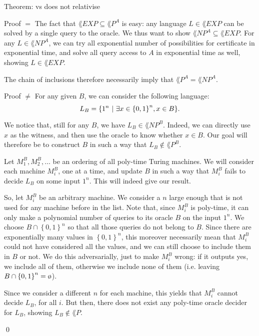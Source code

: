 \documentclass[a4paper]{article}
\begin{document}
\begin{parag}{Theorem:  vs  does not relativise}
\begin{subparag}{Proof $=$}
        The fact that $\lang{EXP} \subseteq \lang{P}^A$ is easy: any language $L \in \lang{EXP}$ can be solved by a single query to the oracle. We thus want to show $\lang{NP}^A \subseteq \lang{EXP}$. For any $L \in \lang{NP}^A$, we can try all exponential number of possibilities for certificate in exponential time, and solve all query access to $A$ in exponential time as well, showing $L \in \lang{EXP}$.

        The chain of inclusions therefore necessarily imply that $\lang{P}^A = \lang{NP}^A$.
    \end{subparag}

    \begin{subparag}{Proof $\neq$}
        For any given $B$, we can consider the following language: 
        \[L_B = \left\{1^n \suchthat \exists x \in \left\{0, 1\right\}^n, x \in B\right\}.\]

        We notice that, still for any $B$, we have $L_B \in \lang{NP}^B$. Indeed, we can directly use $x$ as the witness, and then use the oracle to know whether $x \in B$. Our goal will therefore be to construct $B$ in such a way that $L_B \not \in \lang{P}^B$.

        Let $M_1^B, M_2^B, \ldots$ be an ordering of all poly-time Turing machines. We will consider each machine $M_i^B$, one at a time, and update $B$ in such a way that $M_i^B$ fails to decide $L_B$ on some input $1^n$. This will indeed give our result. 

        So, let $M_i^B$ be an arbitrary machine. We consider a $n$ large enough that is not used for any machine before in the list. Note that, since $M_i^B$ is poly-time, it can only make a polynomial number of queries to its oracle $B$ on the input $1^n$. We choose $B \cap \left\{0, 1\right\}^n$ so that all those queries do not belong to $B$. Since there are exponentially many values in $\left\{0, 1\right\}^n$, this moreover necessarily mean that $M_i^B$ could not have considered all the values, and we can still choose to include them in $B$ or not. We do this adversarially, just to make $M_i^B$ wrong: if it outputs yes, we include all of them, otherwise we include none of them (i.e. leaving $B \cap \left\{0, 1\right\}^n = \o$).

        Since we consider a different $n$ for each machine, this yields that $M_i^B$ cannot decide $L_B$, for all $i$. But then, there does not exist any poly-time oracle decider for $L_B$, showing $L_B \not \in \lang{P}$.

        \qed
    \end{subparag}
\end{parag}
\end{document}
